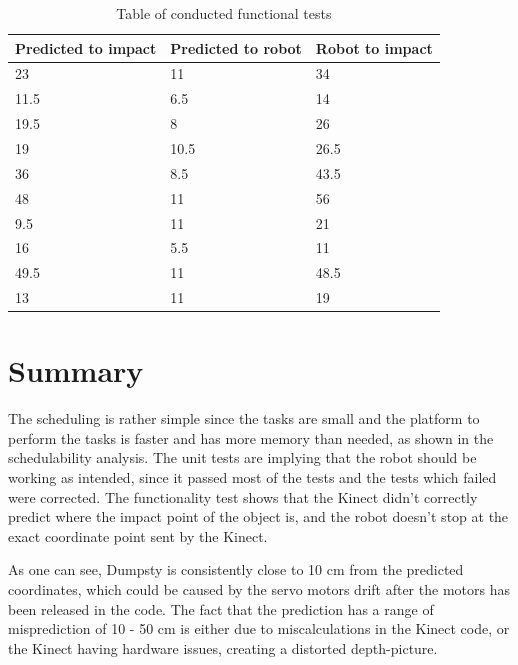 \begin{table}[H]
	\begin{center}
		\begin{tabular}{ | p{5cm} | p{5cm} | p{5cm} |}
			\hline
			\textbf{Predicted to impact} & \textbf{Predicted to robot} & \textbf{Robot to impact} \\ \hline
			23 & 11 & 34 \\ \hline
			11.5 & 6.5 & 14 \\ \hline
			19.5 & 8 & 26 \\ \hline
			19 & 10.5 & 26.5 \\ \hline
			36 & 8.5 & 43.5 \\ \hline
			48 & 11 & 56 \\ \hline
			9.5 & 11 & 21 \\ \hline
			16 & 5.5 & 11 \\ \hline
			49.5 & 11 & 48.5 \\ \hline
			13 & 11 & 19 \\ \hline
			
		\end{tabular}
		\caption{Table of conducted functional tests}
		\label{table:FuncTest}
	\end{center}
\end{table}


\section{Summary}
\label{sec:summary}
The scheduling is rather simple since the tasks are small and the platform to perform the tasks is faster and has more memory than needed, as shown in the schedulability analysis. The unit tests are implying that the robot should be working as intended, since it passed most of the tests and the tests which failed were corrected. The functionality test shows that the Kinect didn’t correctly predict where the impact point of the object is, and the robot doesn’t stop at the exact coordinate point sent by the Kinect. 


As one can see, Dumpsty is consistently close to 10 cm from the predicted coordinates, which could be caused by the servo motors drift after the motors has been released in the code. The fact that the prediction has a range of misprediction of 10 - 50 cm is either due to miscalculations in the Kinect code, or the Kinect having hardware issues, creating a distorted depth-picture.






